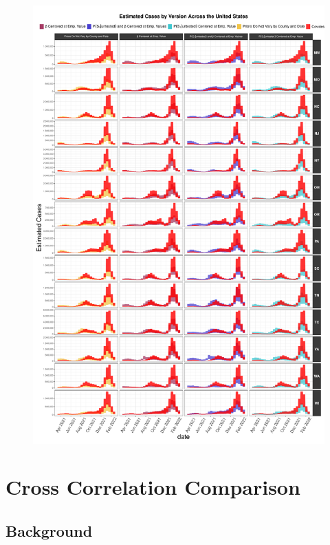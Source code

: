 \documentclass[12pt,twoside]{smiththesis}
\begin{document}
\begin{figure}
\includegraphics[width=1\linewidth]{figure/state_comp_covidestim2} \caption{\label{fig:state-results-2}}\label{fig:unnamed-chunk-81}
\end{figure}
\hypertarget{cross-correlation-comparison}{%
\section{Cross Correlation Comparison}\label{cross-correlation-comparison}}

\hypertarget{background-1}{%
\subsection{Background}\label{background-1}}
\end{document}
